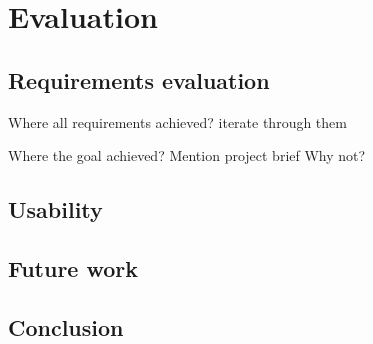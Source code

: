 \section{Evaluation}

\subsection{Requirements evaluation}
Where all requirements achieved? iterate through them

Where the goal achieved? %
Mention project brief
Why not?

\subsection{Usability}


\subsection{Future work}

\subsection{Conclusion}

